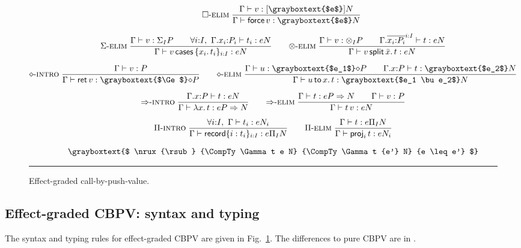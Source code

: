 \documentclass[acmsmall,review,anonymous]{acmart}\settopmatter{printfolios=true,printccs=false,printacmref=false}
\newcommand{\graybox}[1]{\grayboxtext{$#1$}}
\begin{document}
\begin{figure}[htbp]
\begin{gather*}
\qquad
 \nru{\relim\Box}
     {\ValTy \Gamma v {\thunkty {\graybox e} N}
    }{\CompTy \Gamma {\force v} {\graybox e} N}
\\[1.5ex]
 \nru{\relim\GS}
     {\ValTy \Gamma v {\sumt I P} \qquad
      \forall i{:}I,\ \CompTy {\ext \Gamma {x_i} {P_i}} {t_i} e N
    }{\CompTy \Gamma {\caser v {\{x_i.\, t_i\}_{i:I}}} e N}
\qquad
 \nru{\relim\otimes}
     {\ValTy \Gamma v {\tupt I P} \qquad
      \CompTy {\extr \Gamma {\overline{x_i{:}P_i}^{i:I}}} t e N
    }{\CompTy \Gamma {\splits v {\bar x} t} e N}
\\[1.5ex]
 \nru{\rintro\diamond}
     {\ValTy \Gamma v P
    }{\CompTy \Gamma {\ret v} {\graybox \Ge} {\diamond P}}
\qquad
 \nru{\relim\diamond}
     {\CompTy \Gamma u {\graybox{e_1}} {\diamond P} \qquad
      \CompTy {\ext \Gamma x P} t {\graybox{e_2}} N
    }{\CompTy \Gamma {\bind x u t} {\graybox{e_1 \bu e_2}} N}
\\[1.5ex]
 \nru{\rintro\To}
     {\CompTy {\ext \Gamma x P} t e N
    }{\CompTy \Gamma {\lam x t} e {P \To N}}
\qquad
 \nru{\relim\To}
     {\CompTy \Gamma t e {P \To N} \qquad
      \ValTy \Gamma v P
    }{\CompTy \Gamma {\app t v} e N}
\\[1.5ex]
 \nru{\rintro\Pi}
     {\forall i{:}I,\ \CompTy \Gamma {t_i} e {N_i}
    }{\CompTy \Gamma {\trecord {\{i : t_i\}_{i:I}}} e {\rect I N}}
\qquad
 \nru{\relim\Pi}
     {\CompTy \Gamma t e {\rect I N}
    }{\CompTy \Gamma {\proj i t} e  {N_i}}
\\[1.5ex]
\graybox{
 \nrux{\rsub}
      {\CompTy \Gamma t e N}
      {\CompTy \Gamma t {e'} N}
      {e \leq e'}
}
\end{gather*}
\rule{\textwidth}{0.2pt}
  \caption{Effect-graded call-by-push-value.}
  \label{fig:cbpv}
\end{figure}

\subsection{Effect-graded CBPV: syntax and typing}

The syntax and typing rules for effect-graded CBPV are given in
Fig.~\ref{fig:cbpv}.  The differences to pure CBPV are in
\graybox{\mbox{gray boxes}}.
\end{document}

